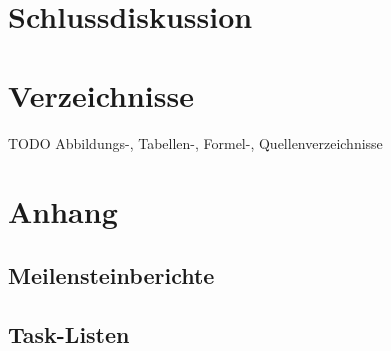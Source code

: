 \documentclass[a4paper]{report}
\begin{document}
\chapter{Schlussdiskussion}

\chapter{Verzeichnisse}
TODO Abbildungs-, Tabellen-, Formel-, Quellenverzeichnisse
\printbibliography

\chapter{Anhang}
\section{Meilensteinberichte}

\section{Task-Listen}
\end{document}
